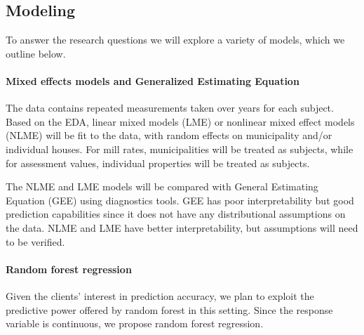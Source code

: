\documentclass{article}
\begin{document}


\subsection{Modeling}



To answer the research questions we will explore a variety of models, which we outline below.

\paragraph{Mixed effects models and Generalized Estimating Equation}

The data contains repeated measurements taken over years for each subject.  Based on the EDA, linear mixed models (LME) or nonlinear mixed effect models (NLME) will be fit to the data, with random effects on municipality and/or individual houses.  For mill rates, municipalities will be treated as subjects, while for assessment values, individual properties will be treated as subjects. 

The NLME and LME models will be compared with General Estimating Equation (GEE) using diagnostics tools. GEE has poor interpretability but good prediction capabilities since it does not have any distributional assumptions on the data. NLME and LME have better interpretability, but assumptions will need to be verified.

\paragraph{Random forest regression}
Given the clients' interest in prediction accuracy, we plan to exploit the predictive power offered by random forest in this setting. Since the response variable is continuous, we propose random forest regression.
\end{document}
